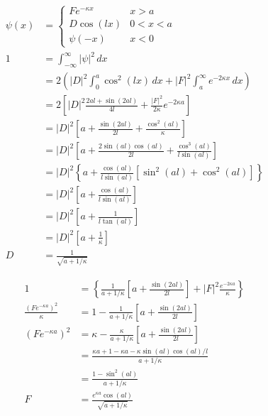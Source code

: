 \documentclass{article}
\begin{document}
\begin{align*}
  \psi(x) & = \begin{cases}
                F e^{-\kappa x} & x > a     \\
                D \cos (l x)    & 0 < x < a \\
                \psi(-x)        & x < 0
              \end{cases}                                                                      \\
  1       & = \int_{-\infty}^\infty |\psi|^2 \,d x                                                             \\
          & = 2 \left( |D|^2 \int_0^a \cos^2 (l x) \,d x + |F|^2 \int_a^\infty e^{-2 \kappa x} \,d x \right)   \\
          & = 2 \left[ |D|^2 \frac{2 a l + \sin (2 a l)}{4 l} + \frac{|F|^2}{2 \kappa} e^{-2 \kappa a} \right] \\
          & = |D|^2 \left[ a + \frac{\sin (2 a l)}{2 l} + \frac{\cos^2 (a l)}{\kappa} \right]                  \\
          & = |D|^2 \left[ a + \frac{2 \sin (a l) \cos (a l)}{2 l} + \frac{\cos^3 (a l)}{l \sin (a l)} \right] \\
          & = |D|^2 \left\{ a + \frac{\cos (a l)}{l \sin (a l)} [\sin^2 (a l) + \cos^2 (a l)] \right\}         \\
          & = |D|^2 \left[ a + \frac{\cos (a l)}{l \sin (a l)} \right]                                         \\
          & = |D|^2 \left[ a + \frac{1}{l \tan (a l)} \right]                                                  \\
          & = |D|^2 \left[ a + \frac{1}{\kappa} \right]                                                        \\
  D       & = \frac{1}{\sqrt{a + 1 / \kappa}}
\end{align*}

\begin{align*}
  1                                  & = \left\{ \frac{1}{a + 1 / \kappa} \left[ a + \frac{\sin (2 a l)}{2 l} \right] + |F|^2 \frac{e^{-2 \kappa a}}{\kappa} \right\} \\
  \frac{(F e^{-\kappa a})^2}{\kappa} & = 1 - \frac{1}{a + 1 / \kappa} \left[ a + \frac{\sin (2 a l)}{2 l} \right]                                                     \\
  (F e^{-\kappa a})^2                & = \kappa - \frac{\kappa}{a + 1 / \kappa} \left[ a + \frac{\sin (2 a l)}{2 l} \right]                                           \\
                                     & = \frac{\kappa a + 1 - \kappa a - \kappa \sin (a l) \cos (a l) / l}{a + 1 / \kappa}                                            \\
                                     & = \frac{1 - \sin^2 (a l)}{a + 1 / \kappa}                                                                                      \\
  F                                  & = \frac{e^{\kappa a} \cos (a l)}{\sqrt{a + 1 / \kappa}}
\end{align*}
\end{document}

